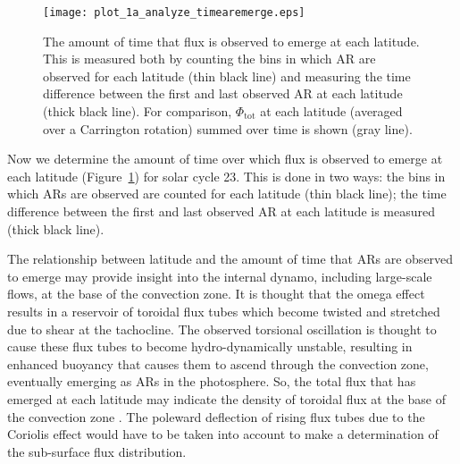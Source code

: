 \begin{figure}[!t]
\centerline{\texttt{[image: plot\_1a\_analyze\_timearemerge.eps]}}
\caption[A plot of the amount of time flux emerges at each latitude.]{The amount of time that flux is observed to emerge at each latitude. This is measured both by counting the bins in which AR are observed for each latitude (thin black line) and measuring the time difference between the first and last observed AR at each latitude (thick black line). For comparison, $\Phi_{\mathrm{tot}}$ at each latitude (averaged over a Carrington rotation) summed over time is shown (gray line).}\label{plot_1a_analyze_timearemerge}
\end{figure}


Now we determine the amount of time over which flux is observed to emerge at each latitude (Figure~\ref{plot_1a_analyze_timearemerge}) for solar cycle 23. This is done in two ways: the bins in which \glspl{AR} are observed are counted for each latitude (thin black line); the time difference between the first and last observed \gls{AR} at each latitude is measured (thick black line). %

The relationship between latitude and the amount of time that \glspl{AR} are observed to emerge may provide insight into the internal dynamo, including large-scale flows, at the base of the convection zone. It is thought that the omega effect results in a reservoir of toroidal flux tubes which become twisted and stretched due to shear at the tachocline. The observed torsional oscillation is thought to cause these flux tubes to become hydro-dynamically unstable, resulting in enhanced buoyancy that causes them to ascend through the convection zone, eventually emerging as \glspl{AR} in the photosphere. So, the total flux that has emerged at each latitude may indicate the density of toroidal flux at the base of the convection zone \citep{Charbonneau:2010}.
The poleward deflection of rising flux tubes due to the Coriolis effect would have to be taken into account to make a determination of the sub-surface flux distribution.

